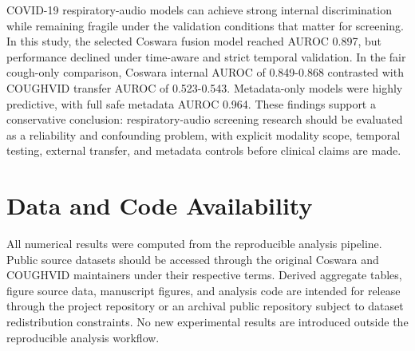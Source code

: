 \documentclass[preprint,12pt]{elsarticle}
\begin{document}
COVID-19 respiratory-audio models can achieve strong internal discrimination while remaining fragile under the validation conditions that matter for screening. In this study, the selected Coswara fusion model reached AUROC 0.897, but performance declined under time-aware and strict temporal validation. In the fair cough-only comparison, Coswara internal AUROC of 0.849-0.868 contrasted with COUGHVID transfer AUROC of 0.523-0.543. Metadata-only models were highly predictive, with full safe metadata AUROC 0.964. These findings support a conservative conclusion: respiratory-audio screening research should be evaluated as a reliability and confounding problem, with explicit modality scope, temporal testing, external transfer, and metadata controls before clinical claims are made.

\section*{Data and Code Availability}

All numerical results were computed from the reproducible analysis pipeline. Public source datasets should be accessed through the original Coswara and COUGHVID maintainers under their respective terms. Derived aggregate tables, figure source data, manuscript figures, and analysis code are intended for release through the project repository or an archival public repository subject to dataset redistribution constraints. No new experimental results are introduced outside the reproducible analysis workflow.



\end{document}
